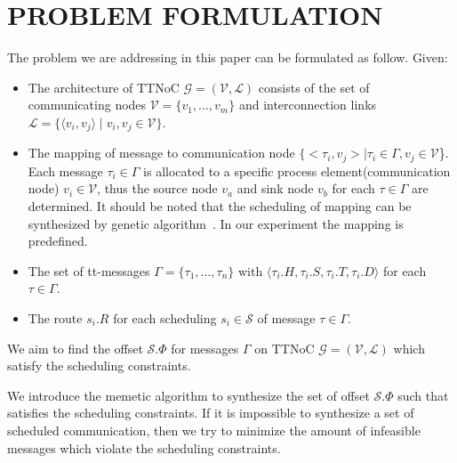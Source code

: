 \documentclass[journal]{IEEEtran}
\newcommand{\calG}{\mathcal{G}}
\newcommand{\calV}{\mathcal{V}}
\newcommand{\calL}{\mathcal{L}}
\newcommand{\calS}{\mathcal{S}}
\begin{document}
\section{PROBLEM FORMULATION\label{s:formulation}}
The problem we are addressing in this paper can be formulated as follow. Given:
\begin{itemize}
	\item The architecture of TTNoC $\calG=(\calV,\calL)$ consists of the set of communicating nodes $\mathcal{V}=\{\mathit{v}_{1},\dots,\mathit{v}_{m}\}$ and interconnection links $\mathcal{L}=\{ \langle v_i,v_j  \rangle \mid  v_i,v_j \in \calV\}$.
	\item The mapping of message to communication node
		$\{<\tau_{i},v_{j}>\mid \tau_{i}\in\Gamma,v_{j}\in\mathcal{V}$\}. 
		Each message $\tau_{i}\in\Gamma$ is allocated to a specific process element(communication node) $v_{i}\in\mathcal{V}$, 
		thus the source node $v_{a}$ and sink node $v_{b}$ for each $\tau \in\Gamma$ are determined.
		It should be noted that the scheduling of mapping can be synthesized by genetic algorithm~\cite{DBLP:conf/recosoc/MesidisI11}.
		In our experiment the mapping is predefined.
	\item The set of tt-messages $ \Gamma = \{\tau_{1},\dots,\tau_{n} \}$ with 
	$\langle \tau_{i}.H,\tau_{i}.S, \tau_{i}.T,	\tau_{i}.D\rangle$ for each $\tau \in \Gamma$.
	\item The route $s_i.R$ for each scheduling $s_i \in \calS$ of message $\tau \in \Gamma$.
\end{itemize}
We aim to find the offset $\calS.\Phi$ for messages $\Gamma$ on TTNoC $\calG=(\calV,\calL)$ which satisfy the scheduling constraints. 

We introduce the memetic algorithm to synthesize the set of offset $\calS.\Phi$ such that satisfies the scheduling constraints. 
If it is impossible to synthesize a set of scheduled communication, 
then we try to minimize the amount of infeasible messages which violate the scheduling constraints.
\end{document}
